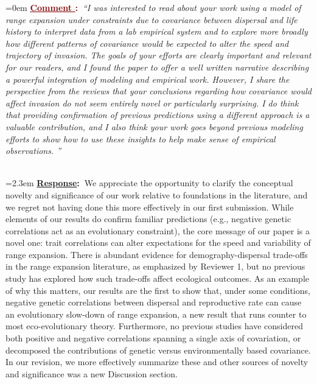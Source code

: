 \documentclass[12pt]{article}
\newcounter{cN}
\newcommand{\comment}[1]{
	\vspace{2em} 
	\refstepcounter{cN} %
	\noindent \hangindent=0em \textbf{\textcolor{Maroon}{\uline{Comment \thecN}:~}}\emph{``#1''}
	}
\newcommand{\response}[1]{
	\\[0.25em] 
	\hangindent=2.3em \textbf{\textcolor{NavyBlue}{\uline{Response}:~}}#1 
	}
\begin{document}
\comment{I was interested to read about your work using a model of range expansion under constraints due to covariance between dispersal and life history to interpret data from a lab empirical system and to explore more broadly how different patterns of covariance would be expected to alter the speed and trajectory of invasion. 
The goals of your efforts are clearly important and relevant for our readers, and I found the paper to offer a well written narrative describing a powerful integration of modeling and empirical work. 
However, I share the perspective from the reviews that your conclusions regarding how covariance would affect invasion do not seem entirely novel or particularly surprising. 
I do think that providing confirmation of previous predictions using a different approach is a valuable contribution, and I also think your work goes beyond previous modeling efforts to show how to use these insights to help make sense of empirical observations. }
\response{We appreciate the opportunity to clarify the conceptual novelty and significance of our work relative to foundations in the literature, and we regret not having done this more effectively in our first submission. 
While elements of our results do confirm familiar predictions (e.g., negative genetic correlations act as an evolutionary constraint), the core message of our paper is a novel one: trait correlations can alter expectations for the speed and variability of range expansion.
There is abundant evidence for demography-dispersal trade-offs in the range expansion literature, as emphasized by Reviewer 1, but no previous study has explored how such trade-offs affect ecological outcomes. 
As an example of why this matters, our results are the first to show that, under some conditions, negative genetic correlations between dispersal and reproductive rate can cause an evolutionary slow-down of range expansion, a new result that runs counter to most eco-evolutionary theory. 
Furthermore, no previous studies have considered both positive and negative correlations spanning a single axis of covariation, or decomposed the contributions of genetic versus environmentally based covariance.
In our revision, we more effectively summarize these and other sources of novelty and significance was a new Discussion section.}
\end{document}
